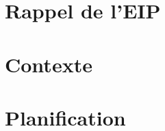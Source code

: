 \documentclass[11pt]{report}
\begin{document}
\tableofcontents
{}
\thispagestyle{empty}

\chapter{Rappel de l'EIP}
\thispagestyle{EIP} %
\setcounter{page}{1} %


\chapter{Contexte}
\thispagestyle{EIP}


\chapter{Planification}
\thispagestyle{EIP}


\end{document}
